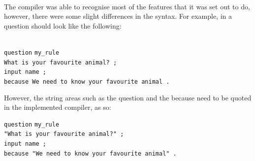 \documentclass[12pt]{report}
\begin{document}
\\
The compiler was able to recognise most of the features that it was set out to do, however, there were some slight differences in the syntax.  For example, in a question should look like the following:\\
\\
\begin{tabbing}
\texttt{question} \= \texttt{my\_rule}\\
\> \texttt{What is your favourite animal? ;}\\
\> \texttt{input name ;}\\
\> \texttt{because We need to know your favourite animal .}\\
\end{tabbing}
However, the string areas such as the question and the because need to be quoted in the implemented compiler, as so:\\
\begin{tabbing}
\texttt{question} \= \texttt{my\_rule}\\
\> \texttt{"What is your favourite animal?" ;}\\
\> \texttt{input name ;}\\
\> \texttt{because "We need to know your favourite animal" .}\\
\end{tabbing}
\end{document}
